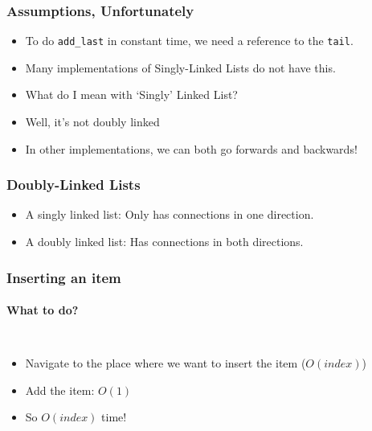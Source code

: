\begin{frame}
	\frametitle{Assumptions, Unfortunately}
	\begin{itemize}
		\item To do \texttt{add\_last} in constant time, we need a reference to the \texttt{tail}.
		\item Many implementations of Singly-Linked Lists do not have this.
		\item What do I mean with `Singly' Linked List?	
		\item Well, it's not doubly linked
		\item In other implementations, we can both go forwards and backwards!	
	\end{itemize}	

\end{frame}

\begin{frame}
	\frametitle{Doubly-Linked Lists}
	\begin{itemize}
		\item A singly linked list: 	Only has connections in one direction.	
		\item A doubly linked list: 	Has connections in both directions.
	\end{itemize}	

\end{frame}

\begin{frame}
	\frametitle{Inserting an item}
	\framesubtitle{What to do?}
	\begin{columns}
	\begin{itemize}
		\item Navigate to the place where we want to insert the item ($O(\textit{index})$)
			
		\item Add the item: $O(1)$
			
		\item So $O(\textit{index})$ time!
	\end{itemize}
			
		
	
			
	\end{columns}
\end{frame}

